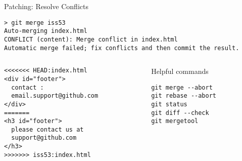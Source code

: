 \begin{frame}[fragile]{Patching: Resolve Conflicts}
  \begin{verbatim}
> git merge iss53
Auto-merging index.html
CONFLICT (content): Merge conflict in index.html
Automatic merge failed; fix conflicts and then commit the result.
  \end{verbatim}
  \begin{columns}
    \begin{column}{0.7\textwidth}
        \begin{verbatim}
<<<<<<< HEAD:index.html
<div id="footer">
  contact :
  email.support@github.com
</div>
=======
<h3 id="footer">
  please contact us at
  support@github.com
</h3>
>>>>>>> iss53:index.html
        \end{verbatim}
    \end{column}
    \begin{column}{0.3\textwidth}
      Helpful commands
      \begin{verbatim}
git merge --abort
git rebase --abort
git status
git diff --check
git mergetool
      \end{verbatim}
    \end{column}
  \end{columns}
\end{frame}
